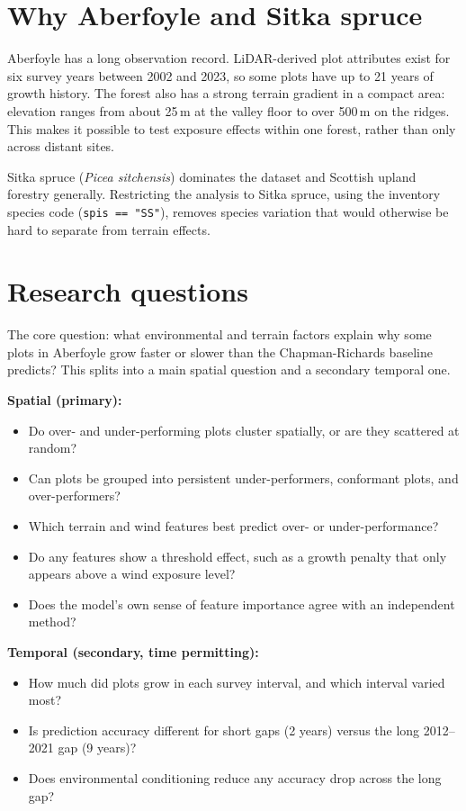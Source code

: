 \section{Why Aberfoyle and Sitka spruce}

Aberfoyle has a long observation record. LiDAR-derived plot attributes exist for six survey years between 2002 and 2023, so some plots have up to 21 years of growth history. The forest also has a strong terrain gradient in a compact area: elevation ranges from about 25\,m at the valley floor to over 500\,m on the ridges. This makes it possible to test exposure effects within one forest, rather than only across distant sites.

Sitka spruce (\emph{Picea sitchensis}) dominates the dataset and Scottish upland forestry generally. Restricting the analysis to Sitka spruce, using the inventory species code (\texttt{spis == "SS"}), removes species variation that would otherwise be hard to separate from terrain effects.

\section{Research questions}

The core question: what environmental and terrain factors explain why some plots in Aberfoyle grow faster or slower than the Chapman-Richards baseline predicts? This splits into a main spatial question and a secondary temporal one.

\textbf{Spatial (primary):}
\begin{itemize}
  \item Do over- and under-performing plots cluster spatially, or are they scattered at random?
  \item Can plots be grouped into persistent under-performers, conformant plots, and over-performers?
  \item Which terrain and wind features best predict over- or under-performance?
  \item Do any features show a threshold effect, such as a growth penalty that only appears above a wind exposure level?
  \item Does the model's own sense of feature importance agree with an independent method?
\end{itemize}

\textbf{Temporal (secondary, time permitting):}
\begin{itemize}
  \item How much did plots grow in each survey interval, and which interval varied most?
  \item Is prediction accuracy different for short gaps (2 years) versus the long 2012--2021 gap (9 years)?
  \item Does environmental conditioning reduce any accuracy drop across the long gap?
\end{itemize}

